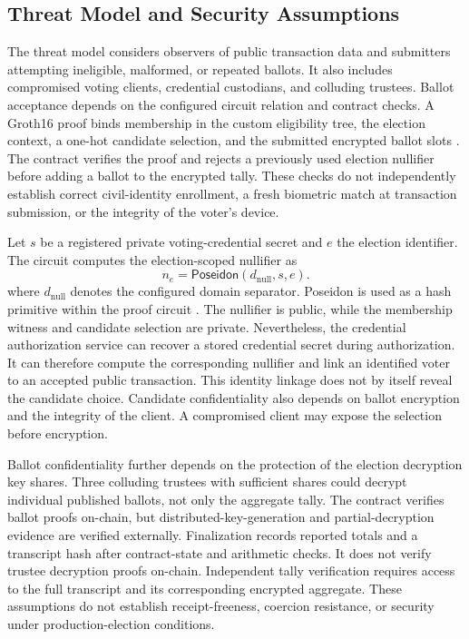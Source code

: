 \subsection{Threat Model and Security Assumptions}
\label{subsec:system-security-objectives}

The threat model considers observers of public transaction data and
submitters attempting ineligible, malformed, or repeated ballots. It
also includes compromised voting clients, credential custodians, and
colluding trustees. Ballot acceptance depends on the configured circuit
relation and contract checks. A Groth16 proof binds membership in the
custom eligibility tree, the election context, a one-hot candidate
selection, and the submitted encrypted ballot slots
\citep{groth2016snark}. The contract verifies the proof and rejects a
previously used election nullifier before adding a ballot to the
encrypted tally. These checks do not independently establish correct
civil-identity enrollment, a fresh biometric match at transaction
submission, or the integrity of the voter's device.

Let $s$ be a registered private voting-credential secret and $e$ the
election identifier. The circuit computes the election-scoped nullifier
as
\begin{equation}
  n_e = \mathsf{Poseidon}(d_{\mathrm{null}},s,e).
  \label{eq:system-nullifier}
\end{equation}
where $d_{\mathrm{null}}$ denotes the configured domain separator.
Poseidon is used as a hash primitive within the proof circuit
\citep{grassi2021poseidon}. The nullifier is public, while the
membership witness and candidate selection are private. Nevertheless,
the credential authorization service can recover a stored credential
secret during authorization. It can therefore compute the corresponding
nullifier and link an identified voter to an accepted public transaction.
This identity linkage does not by itself reveal the candidate choice.
Candidate confidentiality also depends on ballot encryption and the
integrity of the client. A compromised client may expose the selection
before encryption.

Ballot confidentiality further depends on the protection of the
election decryption key shares. Three colluding trustees with sufficient
shares could decrypt individual published ballots, not only the
aggregate tally. The contract verifies ballot proofs on-chain, but
distributed-key-generation and partial-decryption evidence are
verified externally. Finalization records reported totals and a
transcript hash after contract-state and arithmetic checks. It does not
verify trustee decryption proofs on-chain. Independent tally verification
requires access to the full transcript and its corresponding encrypted
aggregate. These assumptions do not establish receipt-freeness,
coercion resistance, or security under production-election conditions.
